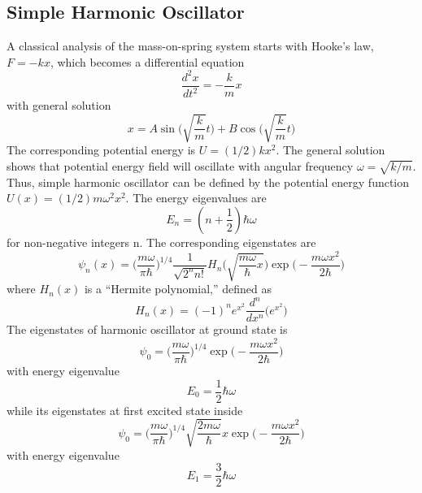\documentclass[../../main.tex]{subfiles}
\begin{document}
\subsection{Simple Harmonic Oscillator}
A classical analysis of the mass-on-spring system starts with Hooke's law, $F = -kx$, which becomes a differential equation 
\begin{equation*}
    \frac{d^2x}{dt^2}=-\frac{k}{m}x
\end{equation*}
with general solution
\begin{equation*}
    x=A\sin \biggl(\sqrt{\frac{k}{m}} t\biggr)+ B \cos \biggl(\sqrt{\frac{k}{m}} t\biggr)
\end{equation*}
The corresponding potential energy is $U=(1/2)kx^2$. The general solution shows that potential energy field will oscillate with angular frequency $\omega = \sqrt{k/m}$. Thus, simple harmonic oscillator can be defined by the potential energy function $U(x) = (1/2)m\omega^2x^2$. The energy eigenvalues are
\begin{equation*}
    E_n = (n + \frac{1}{2})\hbar\omega
\end{equation*}
for non-negative integers n. The corresponding eigenstates are
\begin{equation*}
    \psi_n(x)=\biggl(\frac{m\omega}{\pi \hbar} \biggr)^{1/4}\frac{1}{\sqrt{2^nn!}}H_n \biggl(\sqrt{ \frac{m\omega}{\hbar}x } \biggr) \exp\biggl(-\frac{ m\omega x^2}{2\hbar}\biggr)
\end{equation*}
where $H_n(x)$ is a “Hermite polynomial,” defined as
\begin{equation*}
    H_n(x)=(-1)^ne^{x^2} \frac{d^n}{dx^n}\biggl( e^{x^2} \biggr)
\end{equation*}
The eigenstates of harmonic oscillator at ground state is
\begin{equation*}
    \psi_0=\biggl( \frac{m\omega}{\pi \hbar} \biggr)^{1/4}  \exp\biggl(-\frac{ m\omega x^2}{2\hbar}\biggr)
\end{equation*} 
with energy eigenvalue
\begin{equation*}
    E_0=\frac{1}{2}\hbar\omega
\end{equation*}
while its eigenstates at first excited state inside
\begin{equation*}
    \psi_0=\biggl( \frac{m\omega}{\pi \hbar} \biggr)^{1/4}  \sqrt{\frac{2m\omega}{\hbar}}x \exp\biggl(-\frac{ m\omega x^2}{2\hbar}\biggr)
\end{equation*} 
with energy eigenvalue
\begin{equation*}
    E_1=\frac{3}{2}\hbar\omega
\end{equation*}
\end{document}
